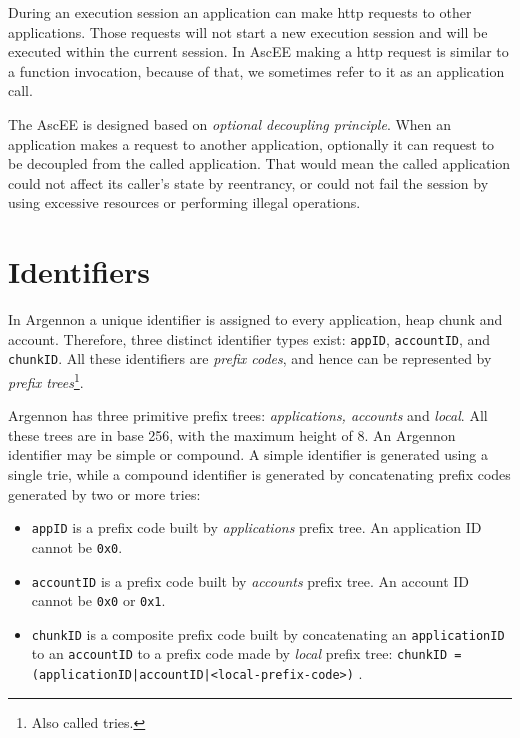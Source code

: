 During an execution session an application can make http requests to other applications. Those requests will not start
a new execution session and will be executed within the current session. In AscEE making a http request is similar to
a function invocation, because of that, we sometimes refer to it as an application
call.

The AscEE is designed based on \emph{optional
decoupling principle}. When an application makes a request to another application, optionally it can request to be
decoupled from the called application. That would mean the called application could not affect its caller's state
by reentrancy, or could not fail the session by using excessive resources or performing illegal operations.


\section{Identifiers}\label{sec:identifiers}

In Argennon a unique identifier is assigned to every application, heap chunk and account. Therefore, three distinct
identifier types exist: \texttt{appID}, \texttt{accountID}, and \texttt{chunkID}.
All these identifiers are \emph{prefix codes}, and hence can be represented by
\emph{prefix trees}\footnote{Also called tries.}.

Argennon has three primitive prefix trees:
\emph{applications, accounts} and \emph{local}.
All these trees are in base 256, with the maximum height
of 8. An Argennon identifier may be simple or compound. A simple identifier is generated using a single trie, while a
compound identifier is generated by concatenating prefix codes generated by two or more tries:

\begin{itemize}
    \item \texttt{appID} is a prefix code built by \emph{applications} prefix tree. An application ID cannot
    be \texttt{0x0}.

    \item \texttt{accountID} is a prefix code built by \emph{accounts} prefix tree. An account ID cannot
    be \texttt{0x0} or \texttt{0x1}.

    \item \texttt{chunkID} is a composite prefix code built by concatenating an \texttt{applicationID} to
    an \texttt{accountID} to a prefix code made by \emph{local} prefix tree:
    \subitem \texttt{chunkID = (applicationID|accountID|<local-prefix-code>)} .
\end{itemize}

